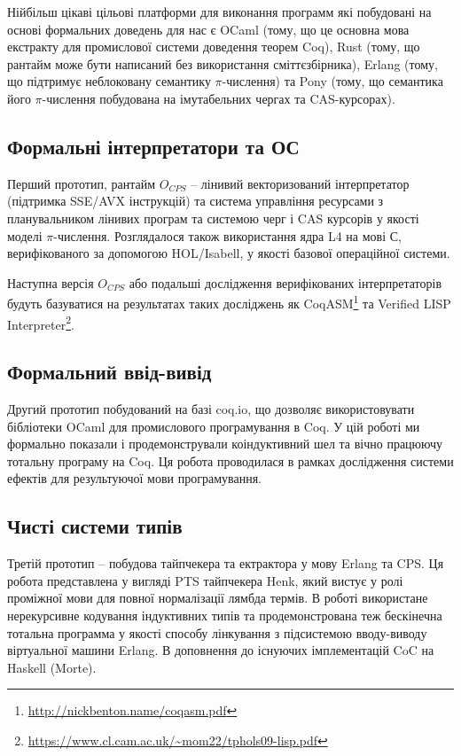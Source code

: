 Нійбільш цікаві цільові платформи для виконання программ
які побудовані на основі формальних доведень для нас є OCaml (тому,
що це основна мова екстракту для промислової системи доведення теорем Coq),
Rust (тому, що рантайм може бути написаний без використання сміттєзбірника),
Erlang (тому, що підтримує неблоковану семантику $\pi$-числення)
та Pony (тому, що семантика його $\pi$-числення побудована на
імутабельних чергах та CAS-курсорах).

\subsection{Формальні інтерпретатори та ОС}
Перший прототип, рантайм $O_{CPS}$ -- лінивий
векторизований інтерпретатор (підтримка SSE/AVX інструкцій) та система
управління ресурсами з планувальником лінивих програм
та системою черг і CAS курсорів у якості моделі $\pi$-числення. Розглядалося також
використання ядра L4 на мові С, верифікованого за допомогою HOL/Isabell,
у якості базової операційної системи.

Наступна версія $O_{CPS}$ або подальші дослідження верифікованих інтерпретаторів
будуть базуватися на результатах таких досліджень як
CoqASM\footnote{\url{http://nickbenton.name/coqasm.pdf}} та
Verified LISP Interpreter\footnote{\url{https://www.cl.cam.ac.uk/~mom22/tphols09-lisp.pdf}}.

\subsection{Формальний ввід-вивід}
Другий прототип побудований на базі coq.io, що дозволяє
використовувати бібліотеки OCaml для промислового програмування в Coq.
У цій роботі ми формально показали і продемонстрували коіндуктивний шел
та вічно працюючу тотальну програму на Coq. Ця робота проводилася
в рамках дослідження системи ефектів для результуючої мови програмування.

\subsection{Чисті системи типів}
Третій прототип -- побудова тайпчекера та ектрактора у мову Erlang та CPS.
Ця робота представлена у вигляді PTS тайпчекера Henk, який вистує у ролі
проміжної мови для повної нормалізації лямбда термів. В роботі використане
нерекурсивне кодування індуктивних типів та продемонстрована теж бескінечна
тотальна программа у якості способу лінкування з підсистемою вводу-виводу
віртуальної машини Erlang. В доповнення до існуючих імплементацій CoC
на Haskell (Morte).

